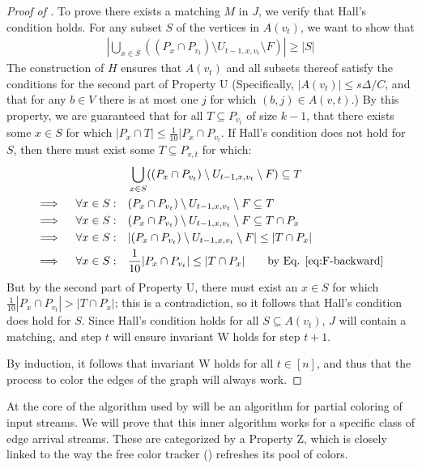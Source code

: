 \documentclass[10pt]{article}
\theoremstyle{definition}\newtheorem{definition}[lemma]{Definition}
\theoremstyle{remark}  \newtheorem*{remark}{Remark}
\begin{document}
\begin{proof}[Proof of ]
  To prove there exists a matching $M$ in $J$, we verify that Hall's condition holds. For any subset $S$ of the vertices in $A(v_t)$, we want to show that
  \begin{align*}
    \left| \bigcup_{x \in S} ((P_x \cap P_{v_t}) \setminus U_{t-1,x,v_t} \setminus F) \right| \ge |S|
  \end{align*}
  The construction of $H$ ensures that $A(v_t)$ and all subsets thereof satisfy the conditions for the second part of Property U (Specifically, $|A(v_t)| \le s \Delta / C$, and that for any $b \in V$ there is at most one $j$ for which $(b,j) \in A(v,t)$.) By this property, we are guaranteed that for all $T \subseteq P_{v_t}$ of size $k-1$, that there exists some $x \in S$ for which $|P_x \cap T| \le \frac{1}{10} |P_x \cap P_{v_t}$. If Hall's condition does not hold for $S$, then there must exist some $T \subseteq P_{v,t}$ for which:
  \begin{align*}
  &\bigcup_{x \in S} ((P_x \cap P_{v_t}) \setminus U_{t-1,x,v_t} \setminus F) \subseteq T \\
  \implies \quad \forall x \in S:\quad & (P_x \cap P_{v_t}) \setminus U_{t-1,x,v_t} \setminus F \subseteq T \\
  \implies \quad \forall x \in S:\quad & (P_x \cap P_{v_t}) \setminus U_{t-1,x,v_t} \setminus F \subseteq T \cap P_x \\
  \implies \quad \forall x \in S:\quad & |(P_x \cap P_{v_t}) \setminus U_{t-1,x,v_t} \setminus F| \le |T \cap P_x| \\
  \implies \quad \forall x \in S: \quad& \frac{1}{10} |P_x \cap P_{v_t}| \le |T \cap P_x| \qquad \text{by Eq. \ref{eq:F-backward}}
  \end{align*}
  But by the second part of Property U, there must exist an $x \in S$ for which $\frac{1}{10} |P_x \cap P_{v_t}| > |T \cap P_x|$; this is a contradiction, so it follows that Hall's condition does hold for $S$. Since Hall's condition holds for all $S \subseteq A(v_t)$, $J$ will contain a matching, and step $t$ will ensure invariant W holds for step $t+1$.

  By induction, it follows that invariant W holds for all $t \in [n]$, and thus that the process to color the edges of the graph will always work.
\end{proof}

At the core of the algorithm used by  will be an algorithm for partial coloring of input streams. We will prove that this inner algorithm  works
for a specific class of edge arrival streams. These are categorized by a Property Z, which is 
closely linked to the way the free color tracker () refreshes its
pool of colors.
\end{document}
